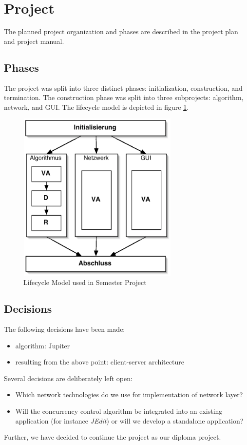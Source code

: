 \documentclass[11pt,a4paper]{article}
\begin{document}
\section{Project}
The planned project organization and phases are described in the project plan and project manual.

\subsection{Phases}
The project was split into three distinct phases: initialization, construction, and termination. The construction phase was split into three subprojects: algorithm, network, and GUI. The lifecycle model is depicted in figure \ref{fig:lifecycle}.

\begin{figure}[H]
 \centering
 \includegraphics[width=8cm,height=8.5cm]{../../images/vorgehensmodell.eps}
 \caption{Lifecycle Model used in Semester Project}
 \label{fig:lifecycle}
\end{figure}

\subsection{Decisions}
The following decisions have been made:
\begin{itemize}
 \item algorithm: Jupiter
 \item resulting from the above point: client-server architecture
\end{itemize}
Several decisions are deliberately left open:
\begin{itemize}
 \item Which network technologies do we use for implementation of network layer?
 \item Will the concurrency control algorithm be integrated into an existing application (for instance \emph{JEdit}) or will we develop a standalone application?
\end{itemize}
Further, we have decided to continue the project as our diploma project.
\end{document}

